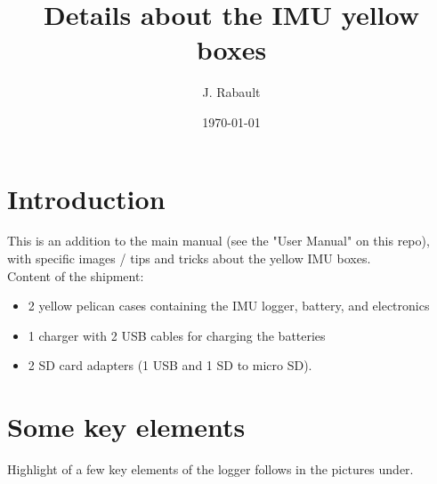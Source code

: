 \documentclass[pdftex,a4paper,12pt,twocolumn,fleqn,captions=tableheading]{scrartcl}
\begin{document}
\title{Details about the IMU yellow boxes}
\author{J. Rabault
  }
\date{\today}

\maketitle

\section{Introduction}

This is an addition to the main manual (see the "User Manual" on this repo), with specific images / tips and tricks about the yellow IMU boxes. \\

Content of the shipment:

\begin{itemize}
  \item 2 yellow pelican cases containing the IMU logger, battery, and electronics
  \item 1 charger with 2 USB cables for charging the batteries
  \item 2 SD card adapters (1 USB and 1 SD to micro SD).
\end{itemize}

\section{Some key elements}

Highlight of a few key elements of the logger follows in the pictures under.
\end{document}
